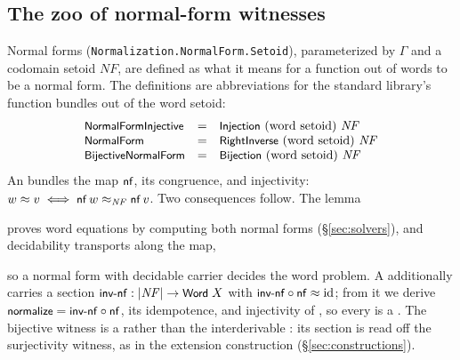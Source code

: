 \subsection{The zoo of normal-form witnesses}\label{sec:nfproperty}

Normal forms (\texttt{Normalization.NormalForm.Setoid}), parameterized by
$\Gamma$ and a codomain setoid $\mathit{NF}$, are defined as what it means
for a function out of words to be a normal form.  The definitions are
abbreviations for the standard library's function bundles out of the word
setoid:
\[
\begin{array}{lcl}
\mbox{\textsf{\small NormalFormInjective}} & = & \mbox{\textsf{\small Injection}}\ \text{(word setoid)}\ \mathit{NF} \\
\mbox{\textsf{\small NormalForm}}          & = & \mbox{\textsf{\small RightInverse}}\ \text{(word setoid)}\ \mathit{NF} \\
\mbox{\textsf{\small BijectiveNormalForm}} & = & \mbox{\textsf{\small Bijection}}\ \text{(word setoid)}\ \mathit{NF}
\end{array}
\]
An  bundles the map $\mbox{\textsf{\small nf}}$, its congruence, and
injectivity: $w \approx v \iff \mbox{\textsf{\small nf}}\,w \approx_{\mathit{NF}}
\mbox{\textsf{\small nf}}\,v$.  Two consequences follow.  The lemma
\begin{code}%
\>[0]\AgdaSpace{}%
\AgdaSymbol{:}\AgdaSpace{}%
\AgdaSpace{}%
\AgdaSpace{}%
\AgdaSpace{}%
\AgdaSpace{}%
\AgdaSpace{}%
\AgdaSpace{}%
\AgdaSpace{}%
\AgdaSpace{}%
\<%
\end{code}
\begin{code}[hide]%
\>[0]\AgdaSpace{}%
\AgdaSymbol{=}\AgdaSpace{}%
\<%
\end{code}
proves word equations by computing both normal forms
(\S\ref{sec:solvers}), and decidability transports along the map,
\begin{code}%
\>[0]\AgdaSpace{}%
\AgdaSymbol{:}\AgdaSpace{}%
\AgdaSpace{}%
\AgdaSpace{}%
\AgdaSpace{}%
\AgdaSpace{}%
\<%
\end{code}
\begin{code}[hide]%
\>[0]\AgdaSpace{}%
\AgdaSymbol{=}\AgdaSpace{}%
\<%
\end{code}
so a normal form with decidable carrier decides the word problem.
A  additionally carries a section
$\mbox{\textsf{\small inv-nf}} : |\mathit{NF}| \to \mbox{\textsf{\small Word}}\;X$ with
$\mbox{\textsf{\small inv-nf}} \circ \mbox{\textsf{\small nf}} \approx \mathrm{id}$; from it we
derive $\mbox{\textsf{\small normalize}} = \mbox{\textsf{\small inv-nf}} \circ \mbox{\textsf{\small nf}}$, its idempotence,
and injectivity of , so every  is a
.  The bijective witness is a 
rather than the interderivable : its section is read off the
surjectivity witness, as in the extension construction
(\S\ref{sec:constructions}).

